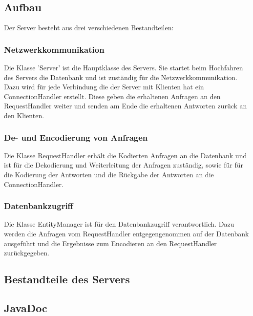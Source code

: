 \documentclass[parskip=full,11pt]{scrartcl}
\begin{document}
\subsection{Aufbau}
Der Server besteht aus drei verschiedenen Bestandteilen:

\subsubsection{Netzwerkkommunikation}
Die Klasse 'Server' ist die Hauptklasse des Servers.
Sie startet beim Hochfahren des Servers die Datenbank und ist zuständig für
die Netzwerkkommunikation. Dazu wird für jede Verbindung die der Server mit
Klienten hat ein ConnectionHandler erstellt. Diese geben die erhaltenen
Anfragen an den RequestHandler weiter und senden am Ende die erhaltenen
Antworten zurück an den Klienten.

\subsubsection{De- und Encodierung von Anfragen}
Die Klasse RequestHandler erhält die Kodierten Anfragen an die Datenbank und
ist für die Dekodierung und Weiterleitung der Anfragen zuständig, sowie für
für die Kodierung der Antworten und die Rückgabe der Antworten an die
ConnectionHandler.

\subsubsection{Datenbankzugriff}
Die Klasse EntityManager ist für den Datenbankzugriff verantwortlich.
Dazu werden die Anfragen vom RequestHandler entgegengenommen auf der Datenbank
ausgeführt und die Ergebnisse zum Encodieren an den RequestHandler
zurückgegeben.

\subsection{Bestandteile des Servers}

\subsection{JavaDoc}
\end{document}
